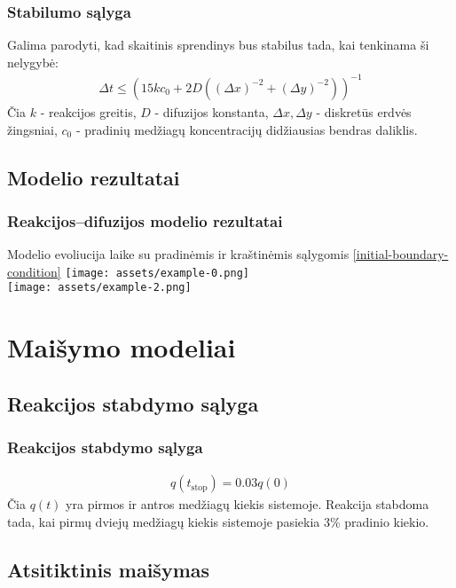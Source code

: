 \documentclass{beamer}
\begin{document}
\begin{frame}
    \frametitle{Stabilumo sąlyga}
    Galima parodyti, kad skaitinis sprendinys bus stabilus tada, kai tenkinama ši nelygybė:
    \begin{align*}
        \Delta t \leqslant \left(15kc_0+2D\left((\Delta x)^{-2}+(\Delta y)^{-2}\right)\right)^{-1}
    \end{align*}
    Čia $k$ - reakcijos greitis, $D$ - difuzijos konstanta, $\Delta x, \Delta y$ - diskretūs erdvės žingsniai, $c_0$ - pradinių medžiagų koncentracijų didžiausias bendras daliklis.
\end{frame}

\subsection{Modelio rezultatai}

\begin{frame}
    \frametitle{Reakcijos--difuzijos modelio rezultatai}
    Modelio evoliucija laike su pradinėmis ir kraštinėmis sąlygomis \eqref{initial-boundary-condition}
    \centering
    \texttt{[image: assets/example-0.png]} \\ 
    \texttt{[image: assets/example-2.png]}

\end{frame}

\section{Maišymo modeliai}
\subsection{Reakcijos stabdymo sąlyga}

\begin{frame}
    \frametitle{Reakcijos stabdymo sąlyga}
    \begin{align*}
        q(t_\text{stop})=0.03q(0)
    \end{align*}
    Čia $q(t)$ yra pirmos ir antros medžiagų kiekis sistemoje. Reakcija stabdoma tada, kai pirmų dviejų medžiagų kiekis sistemoje pasiekia 3\% pradinio kiekio.
\end{frame}

\subsection{Atsitiktinis maišymas}
\end{document}
